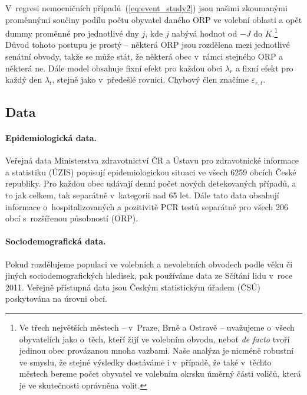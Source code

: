 V~regresi nemocničních případů~(\ref{eq:event_study2}) jsou našimi zkoumanými proměnnými součiny podílu počtu obyvatel daného ORP ve volební oblasti a opět dummy proměnné pro jednotlivé dny $j$, kde $j$ nabývá hodnot od $-J$ do $K$.\footnote{Ve třech největších městech -- v~Praze, Brně a Ostravě -- uvažujeme o~všech obyvatelích jako o~těch, kteří žijí ve volebním obvodu, neboť \textit{de facto} tvoří jedinou obec provázanou mnoha vazbami. Naše analýza je nicméně robustní ve smyslu, že stejné výsledky dostáváme i v~případě, že také v~těchto městech bereme počet obyvatel ve volebním okrsku úměrný části voličů, která je ve skutečnosti oprávněna volit.} Důvod tohoto postupu je prostý -- některá ORP jsou rozdělena mezi jednotlivé senátní obvody, takže se může stát, že některá obec v~rámci stejného ORP  a některá ne. Dále model obsahuje fixní efekt pro každou obci $\lambda_{r}$ a fixní efekt pro každý den $\lambda_{t}$, stejně jako v~předešlé rovnici. Chybový člen značíme $\varepsilon_{r,t}$.

\subsection*{Data}
\paragraph{Epidemiologická data.}  Veřejná data Ministerstva zdravotnictví ČR a Ústavu pro zdravotnické informace a statistiku (ÚZIS) popisují epidemiologickou situaci ve všech 6259 obcích České republiky. Pro každou obec udávají denní počet nových detekovaných případů, a to jak celkem, tak separátně v~kategorii nad 65 let. Dále tato data obsahují informace o~hospitalizovaných a pozitivitě PCR testů separátně pro všech 206 obcí s~rozšířenou působností (ORP). 

\paragraph{Sociodemografická data.} 
Pokud rozdělujeme populaci ve volebních a nevolebních obvodech podle věku či jiných sociodemografických hledisek, pak používáme data ze Sčítání lidu v~roce 2011. Veřejně přístupná data jsou Českým statistickým úřadem (ČSÚ) poskytována na úrovni obcí.

